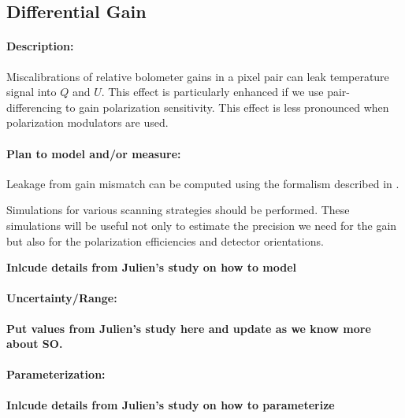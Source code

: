 \subsection{Differential Gain}

\paragraph{Description:}
Miscalibrations of relative bolometer gains in a pixel pair can leak temperature signal into $Q$ and $U$. This effect is particularly enhanced if we use pair-differencing to gain polarization sensitivity. This effect is less pronounced when polarization modulators are used.

\paragraph{Plan to model and/or measure:}
Leakage from gain mismatch can be computed using the formalism described in \cite{rosset2010}.

Simulations for various scanning strategies should be performed. These simulations will be useful not only to estimate the precision we need for the gain but also for the polarization efficiencies and detector orientations.


\textbf{Inlcude details from Julien's study on how to model}

\paragraph{Uncertainty/Range:}

\textbf{Put values from Julien's study here and update as we know more about SO.}

\paragraph{Parameterization:}
\textbf{Inlcude details from Julien's study on how to parameterize}

